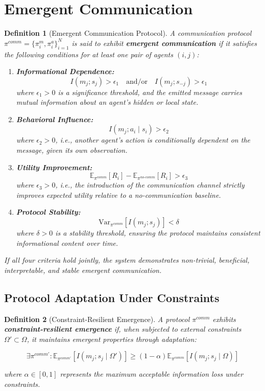 \documentclass{article}
\newtheorem{definition}{Definition}
\begin{document}
\section{Emergent Communication}

\begin{definition}[Emergent Communication Protocol]
A communication protocol $\pi^{comm} = \{\pi_i^m, \pi_i^a\}_{i=1}^N$ is said to exhibit 
\textbf{emergent communication} if it satisfies the following conditions for at least one pair of agents $(i,j)$:

\begin{enumerate}
    \item \textbf{Informational Dependence:}
    \[
    I(m_j; s_j) > \epsilon_1
    \quad \text{and/or} \quad
    I(m_j; s_{-j}) > \epsilon_1
    \]
    where $\epsilon_1 > 0$ is a significance threshold, and the emitted message carries mutual information about an agent's hidden or local state.

    \item \textbf{Behavioral Influence:}
    \[
    I(m_j; a_i \mid s_i) > \epsilon_2
    \]
    where $\epsilon_2 > 0$, i.e., another agent's action is conditionally dependent on the message, given its own observation.

    \item \textbf{Utility Improvement:}
    \[
    \mathbb{E}_{\pi^{comm}}[R_i] - \mathbb{E}_{\pi^{no\text{-}comm}}[R_i] > \epsilon_3
    \]
    where $\epsilon_3 > 0$, i.e., the introduction of the communication channel strictly improves expected utility relative to a no-communication baseline.

    \item \textbf{Protocol Stability:}
    \[
    \text{Var}_{\pi^{comm}}[I(m_j; s_j)] < \delta
    \]
    where $\delta > 0$ is a stability threshold, ensuring the protocol maintains consistent informational content over time.
\end{enumerate}

If all four criteria hold jointly, the system demonstrates \emph{non-trivial, beneficial, interpretable, and stable} emergent communication.
\end{definition}

\subsection{Protocol Adaptation Under Constraints}

\begin{definition}[Constraint-Resilient Emergence]
A protocol $\pi^{comm}$ exhibits \textbf{constraint-resilient emergence} if, when subjected to external constraints $\Omega' \subset \Omega$, it maintains emergent properties through adaptation:

\[
\exists \pi^{comm'} : \mathbb{E}_{\pi^{comm'}}[I(m_j; s_j \mid \Omega')] \geq (1-\alpha) \mathbb{E}_{\pi^{comm}}[I(m_j; s_j \mid \Omega)]
\]

where $\alpha \in [0,1]$ represents the maximum acceptable information loss under constraints.
\end{definition}
\end{document}
